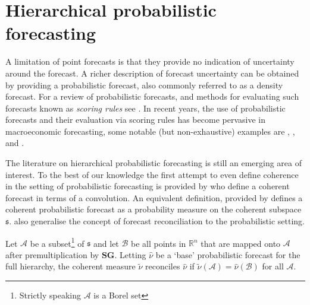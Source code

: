 \documentclass[graybox]{svmult}
\begin{document}
\section{Hierarchical probabilistic forecasting}

A limitation of point forecasts is that they provide no indication of uncertainty around the forecast. A richer description of forecast uncertainty can be obtained by providing a probabilistic forecast, also commonly referred to as a density forecast. For a review of probabilistic forecasts, and methods for evaluating such forecasts known as {\em scoring rules} see  \citep{Gneiting2014}. In recent years, the use of probabilistic forecasts and their evaluation via scoring rules has become pervasive in macroeconomic forecasting, some notable (but non-exhaustive) examples are \cite{GewAmi2010}, \cite{BilEtAl2013}, \cite{CarEtAl2015} and \cite{ClaRav2015}.


The literature on hierarchical probabilistic forecasting is still an emerging area of interest. %
To the best of our knowledge the first attempt to even define coherence in the setting of probabilistic forecasting is provided by \cite{Taieb2017} who define a coherent forecast in terms of a convolution.  An equivalent definition, provided by \cite{Gamakumara2018} defines a  coherent probabilistic forecast as a probability measure on the coherent subspace $\mathfrak{s}$.  \cite{Gamakumara2018} also generalise the concept of forecast reconciliation to the probabilistic setting.

\begin{definition} Let $\mathcal{A}$ be a subset\footnote{Strictly speaking $\mathcal{A}$ is a Borel set} of $\mathfrak{s}$ and let $\mathcal{B}$ be all points in $\mathbb{R}^n$ that are mapped onto  $\mathcal{A}$ after premultiplication by $\bm{S}\bm{G}$. Letting $\hat{\nu}$ be a `base' probabilistic forecast for the full hierarchy, the coherent measure $\tilde{\nu}$ reconciles $\hat{\nu}$ if $\tilde{\nu}(\mathcal{A})=\hat{\nu}(\mathcal{B})$ for all $\mathcal{A}$.
\end{definition}
\end{document}
